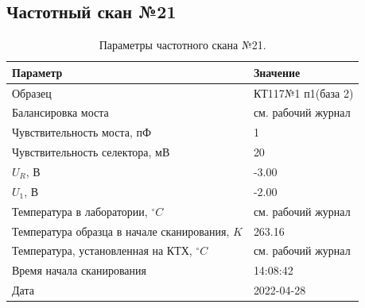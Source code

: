 \subsection{Частотный скан №21}
\begin{table}[!ht]
    \centering
    \caption{Параметры частотного скана №21.}
    \begin{tabular}{|l|l|}
        \hline
        Параметр                                       & Значение                  \\ \hline
        Образец                                        & КТ117№1 п1(база 2)        \\ \hline
        Балансировка моста                             & см. рабочий журнал        \\ \hline
        Чувствительность моста, пФ                     & 1                         \\ \hline
        Чувствительность селектора, мВ                 & 20                        \\ \hline
        $U_R$, В                                       & -3.00                     \\ \hline
        $U_1$, В                                       & -2.00                     \\ \hline
        Температура в лаборатории, $^\circ C$          & см. рабочий журнал        \\ \hline
        Температура образца в начале сканирования, $K$ & 263.16                    \\ \hline
        Температура, установленная на КТХ, $^\circ C$  & см. рабочий журнал        \\ \hline
        Время начала сканирования                      & 14:08:42                  \\ \hline
        Дата                                           & 2022-04-28                \\ \hline
    \end{tabular}
    \label{table:frequency_scan_21}
\end{table}

